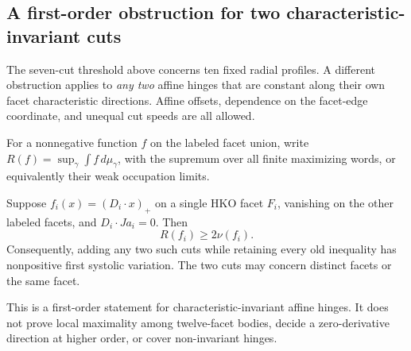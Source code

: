 \subsection{A first-order obstruction for two characteristic-invariant cuts}
\label{subsec:ha-two-hinge}

The seven-cut threshold above concerns ten fixed radial profiles. A different
obstruction applies to \emph{any two} affine hinges that are constant along
their own facet characteristic directions. Affine offsets, dependence on
the facet-edge coordinate, and unequal cut speeds are all allowed.

For a nonnegative function $f$ on the labeled facet union, write
$R(f)=\sup_\gamma\int f\,d\mu_\gamma$, with the supremum over all finite
maximizing words, or equivalently their weak occupation limits.

\begin{theorem}\label{thm:ha-two-hinge}
Suppose $f_i(x)=(D_i\cdot x)_+$ on a single HKO facet $F_i$, vanishing on
the other labeled facets, and $D_i\cdot Ja_i=0$. Then
\begin{equation}\label{eq:ha-amplification}
                         R(f_i)\geq2\nu(f_i).
\end{equation}
Consequently, adding any two such cuts while retaining every old inequality
has nonpositive first systolic variation. The two cuts may concern distinct
facets or the same facet.
\end{theorem}

This is a first-order statement for characteristic-invariant affine hinges.
It does not prove local maximality among twelve-facet bodies, decide a
zero-derivative direction at higher order, or cover non-invariant hinges.

